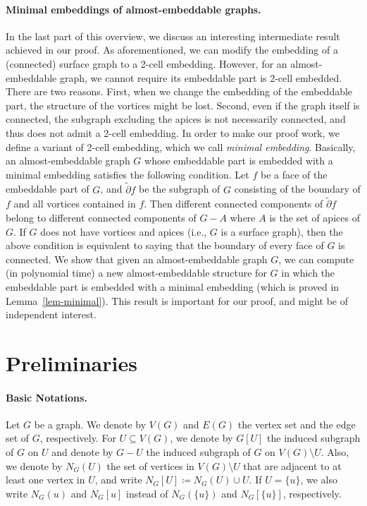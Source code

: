 \documentclass[a4paper,11pt]{article}
\numberwithin{lemma}{section}
\begin{document}
\paragraph{Minimal embeddings of almost-embeddable graphs.}
In the last part of this overview, we discuss an interesting intermediate result achieved in our proof.
As aforementioned, we can modify the embedding of a (connected) surface graph to a 2-cell embedding.
However, for an almost-embeddable graph, we cannot require its embeddable part is 2-cell embedded.
There are two reasons.
First, when we change the embedding of the embeddable part, the structure of the vortices might be lost.
Second, even if the graph itself is connected, the subgraph excluding the apices is not necessarily connected, and thus does not admit a 2-cell embedding.
In order to make our proof work, we define a variant of 2-cell embedding, which we call \emph{minimal embedding}.
Basically, an almost-embeddable graph $G$ whose embeddable part is embedded with a minimal embedding satisfies the following condition.
Let $f$ be a face of the embeddable part of $G$, and $\widetilde{\partial} f$ be the subgraph of $G$ consisting of the boundary of $f$ and all vortices contained in $f$.
Then different connected components of $\widetilde{\partial} f$ belong to different connected components of $G-A$ where $A$ is the set of apices of $G$.
If $G$ does not have vortices and apices (i.e., $G$ is a surface graph), then the above condition is equivalent to saying that the boundary of every face of $G$ is connected.
We show that given an almost-embeddable graph $G$, we can compute (in polynomial time) a new almost-embeddable structure for $G$ in which the embeddable part is embedded with a minimal embedding (which is proved in Lemma~\ref{lem-minimal}).
This result is important for our proof, and might be of independent interest.
 

\section{Preliminaries}
\label{sec-pre}

\paragraph{Basic Notations.}
Let $G$ be a graph.
We denote by $V(G)$ and $E(G)$ the vertex set and the edge set of $G$, respectively.
For $U \subseteq V(G)$, we denote by $G[U]$ the induced subgraph of $G$ on $U$ and denote by $G - U$ the induced subgraph of $G$ on $V(G) \setminus U$.
Also, we denote by $N_G(U)$ the set of vertices in $V(G) \setminus U$ that are adjacent to at least one vertex in $U$, and write $N_G[U] \coloneqq N_G(U) \cup U$.
If $U = \{u\}$, we also write $N_G(u)$ and $N_G[u]$ instead of $N_G(\{u\})$ and $N_G[\{u\}]$, respectively.
\end{document}
